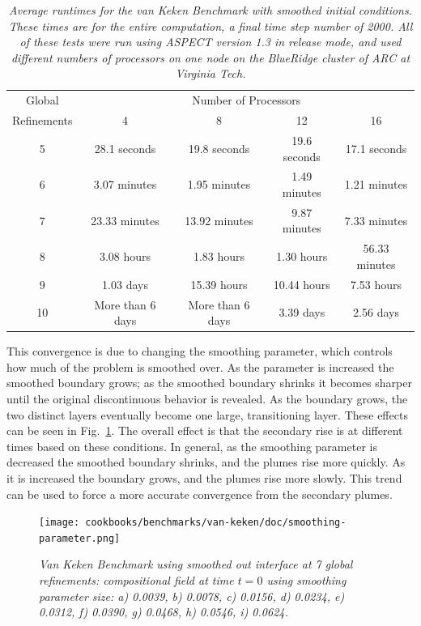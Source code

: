 \documentclass{article}
\begin{document}
\begin{table}[tb]
        \center
        \begin{tabular}{|c|cccc|}
                \hline
                Global & \multicolumn{4}{c}{Number of Processors} \\
                Refinements & 4 & 8 & 12 & 16
                \\ \hline
                5 & 28.1 seconds & 19.8 seconds & 19.6 seconds & 17.1 seconds \\
                6 & 3.07 minutes & 1.95 minutes & 1.49 minutes & 1.21 minutes \\
                7 & 23.33 minutes & 13.92 minutes & 9.87 minutes & 7.33 minutes \\
                8 & 3.08 hours & 1.83 hours & 1.30 hours & 56.33 minutes \\
                9 & 1.03 days & 15.39 hours & 10.44 hours & 7.53 hours \\
                10 & More than 6 days & More than 6 days & 3.39 days & 2.56 days \\ \hline
        \end{tabular}
        \caption{\it Average runtimes for the van Keken Benchmark with smoothed initial conditions.  These times are for the entire computation, a final time step number of 2000.  All of these tests were run using ASPECT version 1.3 in release mode, and used different numbers of processors on one node on the BlueRidge cluster of ARC at Virginia Tech.}
        \label{tab:runtime-table}
\end{table}

This convergence is due to changing the smoothing parameter, which controls how much of the problem is smoothed over.  As the parameter is increased the smoothed boundary grows; as the smoothed boundary shrinks it becomes sharper until the original discontinuous behavior is revealed.  As the boundary grows, the two distinct layers eventually become one large, transitioning layer.  These effects can be seen in Fig.~\ref{fig:vk-5}.  The overall effect is that the secondary rise is at different times based on these conditions.  In general, as the smoothing parameter is decreased the smoothed boundary shrinks, and the plumes rise more quickly.  As it is increased the boundary grows, and the plumes rise more slowly.  This trend can be used to force a more accurate convergence from the secondary plumes.

\begin{figure}
        \centering
        \texttt{[image: cookbooks/benchmarks/van-keken/doc/smoothing-parameter.png]}
        \caption{\it Van Keken Benchmark using smoothed out interface at 7 global refinements: compositional field at time $t=0$ using smoothing parameter size: a) 0.0039, b) 0.0078, c) 0.0156, d) 0.0234, e) 0.0312, f) 0.0390, g) 0.0468, h) 0.0546, i) 0.0624.}
        \label{fig:vk-5}
\end{figure}
\end{document}
